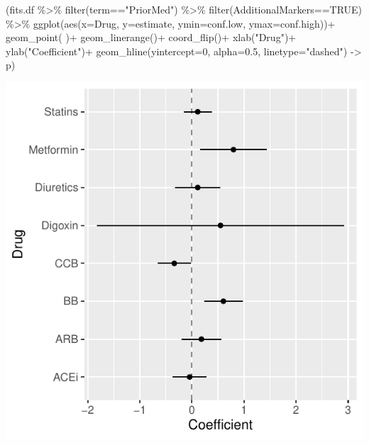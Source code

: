 \documentclass[
]{article}
\newenvironment{Shaded}{\begin{snugshade}}{\end{snugshade}}
\newcommand{\AttributeTok}[1]{\textcolor[rgb]{0.77,0.63,0.00}{#1}}
\newcommand{\ConstantTok}[1]{\textcolor[rgb]{0.00,0.00,0.00}{#1}}
\newcommand{\DecValTok}[1]{\textcolor[rgb]{0.00,0.00,0.81}{#1}}
\newcommand{\FloatTok}[1]{\textcolor[rgb]{0.00,0.00,0.81}{#1}}
\newcommand{\FunctionTok}[1]{\textcolor[rgb]{0.00,0.00,0.00}{#1}}
\newcommand{\NormalTok}[1]{#1}
\newcommand{\OtherTok}[1]{\textcolor[rgb]{0.56,0.35,0.01}{#1}}
\newcommand{\SpecialCharTok}[1]{\textcolor[rgb]{0.00,0.00,0.00}{#1}}
\newcommand{\StringTok}[1]{\textcolor[rgb]{0.31,0.60,0.02}{#1}}
\begin{document}
\begin{Shaded}
\begin{Highlighting}[]
\NormalTok{(fits.df  }\SpecialCharTok{\%\textgreater{}\%} 
  \FunctionTok{filter}\NormalTok{(term}\SpecialCharTok{==}\StringTok{"PriorMed"}\NormalTok{) }\SpecialCharTok{\%\textgreater{}\%} 
  \FunctionTok{filter}\NormalTok{(AdditionalMarkers}\SpecialCharTok{==}\ConstantTok{TRUE}\NormalTok{) }\SpecialCharTok{\%\textgreater{}\%} 
  \FunctionTok{ggplot}\NormalTok{(}\FunctionTok{aes}\NormalTok{(}\AttributeTok{x=}\NormalTok{Drug, }\AttributeTok{y=}\NormalTok{estimate, }\AttributeTok{ymin=}\NormalTok{conf.low, }\AttributeTok{ymax=}\NormalTok{conf.high))}\SpecialCharTok{+}
  \FunctionTok{geom\_point}\NormalTok{( )}\SpecialCharTok{+}
  \FunctionTok{geom\_linerange}\NormalTok{()}\SpecialCharTok{+}
  \FunctionTok{coord\_flip}\NormalTok{()}\SpecialCharTok{+}
  \FunctionTok{xlab}\NormalTok{(}\StringTok{"Drug"}\NormalTok{)}\SpecialCharTok{+}
  \FunctionTok{ylab}\NormalTok{(}\StringTok{"Coefficient"}\NormalTok{)}\SpecialCharTok{+}
  \FunctionTok{geom\_hline}\NormalTok{(}\AttributeTok{yintercept=}\DecValTok{0}\NormalTok{, }\AttributeTok{alpha=}\FloatTok{0.5}\NormalTok{, }\AttributeTok{linetype=}\StringTok{"dashed"}\NormalTok{) }\OtherTok{{-}\textgreater{}}\NormalTok{ p)}
\end{Highlighting}
\end{Shaded}

\includegraphics{../results/report_files/figure-latex/med-effect-forest-1.pdf}
\end{document}
